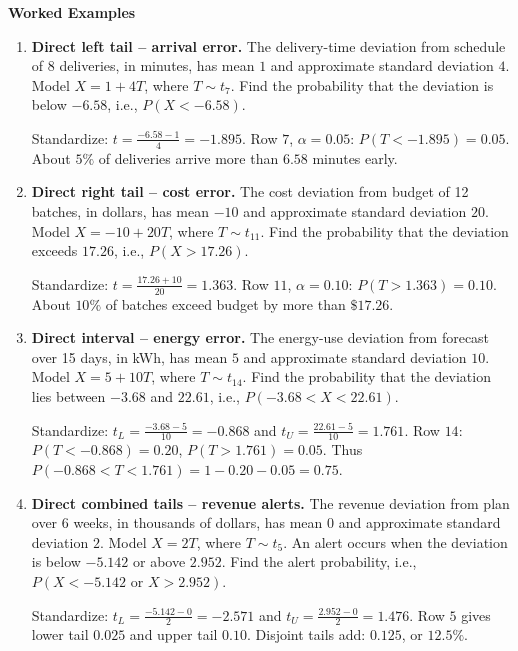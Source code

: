 	\begin{center}\textbf{Worked Examples}\end{center}
	\begin{enumerate}[leftmargin=*,itemsep=7pt,parsep=0pt,topsep=2pt]
		\item \textbf{Direct left tail -- arrival error.} The delivery-time deviation from schedule of 8 deliveries, in minutes, has mean $1$ and approximate standard deviation $4$. Model $X=1+4T$, where $T\sim t_{7}$. Find the probability that the deviation is below $-6.58$, i.e., $P(X<-6.58)$.
		\par Standardize: $t=\frac{-6.58-1}{4}=-1.895$. Row $7$, $\alpha=0.05$: $P(T<-1.895)=\boxed{0.05}$. About $5\%$ of deliveries arrive more than $6.58$ minutes early.
		
		\item \textbf{Direct right tail -- cost error.} The cost deviation from budget of 12 batches, in dollars, has mean $-10$ and approximate standard deviation $20$. Model $X=-10+20T$, where $T\sim t_{11}$. Find the probability that the deviation exceeds $17.26$, i.e., $P(X>17.26)$.
		\par Standardize: $t=\frac{17.26+10}{20}=1.363$. Row $11$, $\alpha=0.10$: $P(T>1.363)=\boxed{0.10}$. About $10\%$ of batches exceed budget by more than $\$17.26$.
		
		\item \textbf{Direct interval -- energy error.} The energy-use deviation from forecast over 15 days, in kWh, has mean $5$ and approximate standard deviation $10$. Model $X=5+10T$, where $T\sim t_{14}$. Find the probability that the deviation lies between $-3.68$ and $22.61$, i.e., $P(-3.68<X<22.61)$.
		\par Standardize: $t_L=\frac{-3.68-5}{10}=-0.868$ and $t_U=\frac{22.61-5}{10}=1.761$. Row $14$: $P(T<-0.868)=0.20$, $P(T>1.761)=0.05$. Thus $P(-0.868<T<1.761)=1-0.20-0.05=\boxed{0.75}$.
		
		\item \textbf{Direct combined tails -- revenue alerts.} The revenue deviation from plan over 6 weeks, in thousands of dollars, has mean $0$ and approximate standard deviation $2$. Model $X=2T$, where $T\sim t_{5}$. An alert occurs when the deviation is below $-5.142$ or above $2.952$. Find the alert probability, i.e., $P(X<-5.142\text{ or }X>2.952)$.
		\par Standardize: $t_L=\frac{-5.142-0}{2}=-2.571$ and $t_U=\frac{2.952-0}{2}=1.476$. Row $5$ gives lower tail $0.025$ and upper tail $0.10$. Disjoint tails add: $\boxed{0.125}$, or $12.5\%$.
		

\end{enumerate}
